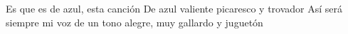     Es que es de azul, esta canción
    De azul valiente picaresco y trovador
    Así será siempre mi voz
    de un tono alegre, muy gallardo y juguetón
\endverse